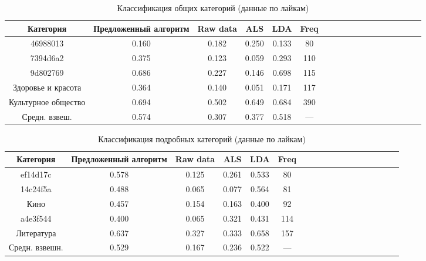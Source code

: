 \documentclass[times,specification,annotation]{itmo-student-thesis}
\begin{document}
\begin{table}[!h]
\caption{Классификация общих категорий (данные по лайкам)}\label{tab-likes-g}
\centering
\begin{tabular}{|*{18}{c|}}\hline
Категория & Предложенный алгоритм  & Raw data & ALS & LDA & Freq \\\hline
46988013                          & 0.160 & 0.182 & 0.250 & 0.133 & 80 \\\hline
7394d6a2                          & 0.375 & 0.123 & 0.059 & 0.293 & 110 \\\hline
9d802769                          & 0.686 & 0.227 & 0.146 & 0.698 & 115 \\\hline
Здоровье и красота       & 0.364 & 0.140 & 0.051 & 0.171 & 117  \\\hline
Культурное общество   & 0.694 & 0.502 & 0.649 & 0.684 & 390 \\\hline
Средн. взвеш.                  & 0.574 & 0.307 & 0.377 & 0.518 & --- \\\hline
\end{tabular}
\end{table}

\begin{table}[!h]
\caption{Классификация подробных категорий (данные по лайкам)}\label{tab-likes-d}
\centering
\begin{tabular}{|*{18}{c|}}\hline
Категория & Предложенный алгоритм  & Raw data & ALS & LDA & Freq \\\hline
ef14d17c             & 0.578 & 0.125 & 0.261 & 0.533 & 80 \\\hline
14c24f5a             & 0.488 & 0.065 & 0.077 & 0.564 & 81 \\\hline
Кино            & 0.457 & 0.154 & 0.163 & 0.400 & 92 \\\hline
a4e3f544             & 0.400 & 0.065 & 0.321 & 0.431 & 114  \\\hline
Литература            & 0.637 & 0.327 & 0.333 & 0.658 & 157 \\\hline
Средн. взвешн.  & 0.529 & 0.167 & 0.236 & 0.522 & --- \\\hline
\end{tabular}
\end{table}
\end{document}
